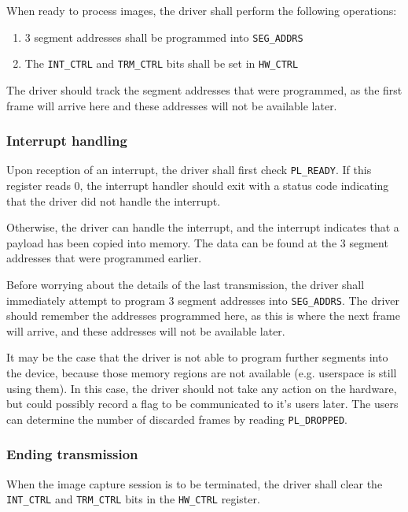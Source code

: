 \documentclass[12pt]{article}
\begin{document}
When ready to process images, the driver shall perform the following operations:

\begin{enumerate}
\item 3 segment addresses shall be programmed into \texttt{SEG\_ADDRS}
\item The \texttt{INT\_CTRL} and \texttt{TRM\_CTRL} bits shall be set in \texttt{HW\_CTRL}
\end{enumerate}

The driver should track the segment addresses that were programmed, as the first frame will arrive here and these addresses will not be available later.

\subsubsection{Interrupt handling}

Upon reception of an interrupt, the driver shall first check \texttt{PL\_READY}. If this register reads 0, the interrupt handler should exit with a status code indicating that the driver did not handle the interrupt.

Otherwise, the driver can handle the interrupt, and the interrupt indicates that a payload has been copied into memory. The data can be found at the 3 segment addresses that were programmed earlier.

Before worrying about the details of the last transmission, the driver shall immediately attempt to program 3 segment addresses into \texttt{SEG\_ADDRS}. The driver should remember the addresses programmed here, as this is where the next frame will arrive, and these addresses will not be available later.

It may be the case that the driver is not able to program further segments into the device, because those memory regions are not available (e.g. userspace is still using them). In this case, the driver should not take any action on the hardware, but could possibly record a flag to be communicated to it's users later. The users can determine the number of discarded frames by reading \texttt{PL\_DROPPED}.

\subsubsection{Ending transmission}

When the image capture session is to be terminated, the driver shall clear the \texttt{INT\_CTRL} and \texttt{TRM\_CTRL} bits in the \texttt{HW\_CTRL} register.
\end{document}
